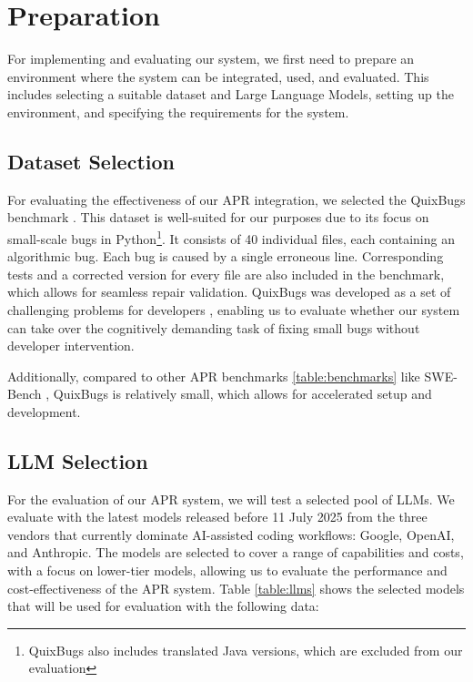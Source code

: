 \section{Preparation}

For implementing and evaluating our system, we first need to prepare an environment where the system can be integrated, used, and evaluated. This includes selecting a suitable dataset and Large Language Models, setting up the environment, and specifying the requirements for the system.

\subsection{Dataset Selection}

For evaluating the effectiveness of our APR integration, we selected the QuixBugs benchmark \cite{linQuixBugsMultilingualProgram2017}. This dataset is well-suited for our purposes due to its focus on small-scale bugs in Python\footnote{QuixBugs also includes translated Java versions, which are excluded from our evaluation}. It consists of 40 individual files, each containing an algorithmic bug. Each bug is caused by a single erroneous line. Corresponding tests and a corrected version for every file are also included in the benchmark, which allows for seamless repair validation. QuixBugs was developed as a set of challenging problems for developers \cite{linQuixBugsMultilingualProgram2017}, enabling us to evaluate whether our system can take over the cognitively demanding task of fixing small bugs without developer intervention.

Additionally, compared to other APR benchmarks \ref{table:benchmarks} like SWE-Bench \cite{jimenezSWEbenchCanLanguage2024}, QuixBugs is relatively small, which allows for accelerated setup and development.

\subsection{LLM Selection} \label{subsection:llm-selection}
For the evaluation of our APR system, we will test a selected pool of \acp{LLM}. We evaluate with the latest models released before 11 July 2025 from the three vendors that currently dominate AI-assisted coding workflows: Google, OpenAI, and Anthropic. The models are selected to cover a range of capabilities and costs, with a focus on lower-tier models, allowing us to evaluate the performance and cost-effectiveness of the APR system. Table \ref{table:llms} shows the selected models that will be used for evaluation with the following data:

